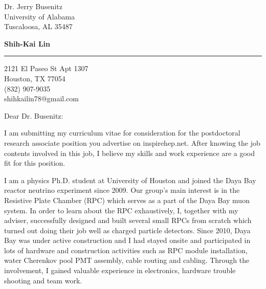 \documentclass{letter} %
\begin{document}
\signature{Shih-Kai Lin}           %
\longindentation=0pt                       %
\let\raggedleft\raggedright                %
 
 
\begin{letter}{Dr. Jerry Busenitz \\
University of Alabama \\
Tuscaloosa, AL 35487}

\begin{center}
{\large\bf Shih-Kai Lin} 
\end{center}
\medskip\hrule height 1pt
\begin{center}
{2121 El Paseo St Apt 1307 \\   Houston, TX 77054 \\ (832) 907-9035 \\ shihkailin78@gmail.com} 
\end{center} \vfill %
 
 
\opening{Dear Dr. Busenitz:} 
 
\noindent %
I am submitting my curriculum vitae for consideration for the postdoctoral research associate position you advertise on inspirehep.net. After knowing the job contents involved in this job, I believe my skills and work experience are a good fit for this position.
 
\noindent %
I am a physics Ph.D. student at University of Houston and joined the Daya Bay reactor neutrino experiment since 2009. Our group's main interest is in the Resistive Plate Chamber (RPC) which serves as a part of the Daya Bay muon system. In order to learn about the RPC exhaustively, I, together with my adviser, successfully designed and built several small RPCs from scratch which turned out doing their job well as charged particle detectors. Since 2010, Daya Bay was under active construction and I had stayed onsite and participated in lots of hardware and construction activities such as RPC module installation, water Cherenkov pool PMT assembly, cable routing and cabling. Through the involvement, I gained valuable experience in electronics, hardware trouble shooting and team work.


\end{letter}
\end{document}
